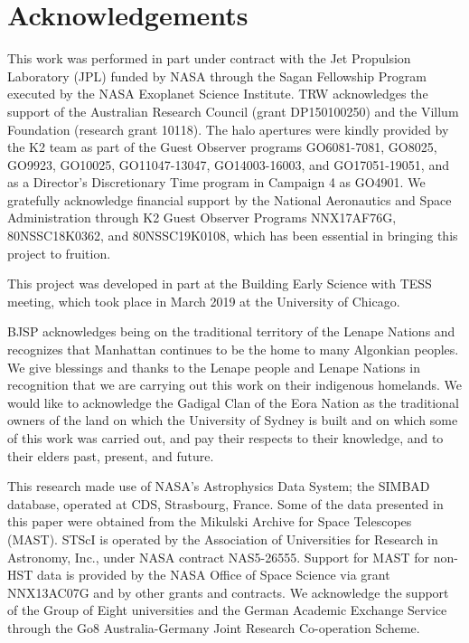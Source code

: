\documentclass[modern]{aastex62}
\begin{document}
\section*{Acknowledgements} %

This work was performed in part under contract with the Jet Propulsion Laboratory (JPL) funded by NASA through the Sagan Fellowship Program executed by the NASA Exoplanet Science Institute. TRW acknowledges the support of the Australian Research Council (grant DP150100250) and the Villum Foundation (research grant 10118). The halo apertures were kindly provided by the K2 team as part of the Guest Observer programs GO6081-7081, GO8025, GO9923, GO10025, GO11047-13047, GO14003-16003, and GO17051-19051, and as a Director's Discretionary Time program in Campaign 4 as GO4901. We gratefully acknowledge financial support by the National Aeronautics and Space Administration through K2 Guest Observer Programs NNX17AF76G, 80NSSC18K0362, and 80NSSC19K0108, which has been essential in bringing this project to fruition.

This project was developed in part at the Building Early Science with TESS meeting, which took place in March 2019 at the University of Chicago.

BJSP acknowledges being on the traditional territory of the Lenape Nations and recognizes that Manhattan continues to be the home to many Algonkian peoples. We give blessings and thanks to the Lenape people and Lenape Nations in recognition that we are carrying out this work on their indigenous homelands. We would like to acknowledge the Gadigal Clan of the Eora Nation as the traditional owners of the land on which the University of Sydney is built and on which some of this work was carried out, and pay their respects to their knowledge, and to their elders past, present, and future.
%

This research made use of NASA's Astrophysics Data System; the SIMBAD database, operated at CDS, Strasbourg, France. Some of the data presented in this paper were obtained from the Mikulski Archive for Space Telescopes (MAST). STScI is operated by the Association of Universities for Research in Astronomy, Inc., under NASA contract NAS5-26555. Support for MAST for non-HST data is provided by the NASA Office of Space Science via grant NNX13AC07G and by other grants and contracts. We acknowledge the support of the Group of Eight universities and the German Academic Exchange Service through the Go8 Australia-Germany Joint Research Co-operation Scheme. 
\end{document}
